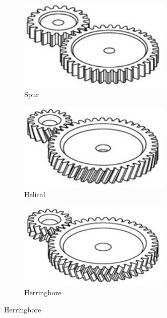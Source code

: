 \documentclass[10pt,letterpaper]{book}
\begin{document}
\begin{figure}[H]
	\begin{subfigure}[b]{.32\linewidth}
		\includegraphics[width=0.8\textwidth]{imgs/gear_spur.png}
		\caption{Spur}
	\end{subfigure}\begin{subfigure}[b]{.32\linewidth}
		\includegraphics[width=0.8\textwidth]{imgs/gear_helical.png}
		\caption{Helical}
	\end{subfigure}\begin{subfigure}[b]{.32\linewidth}
		\includegraphics[width=0.8\textwidth]{imgs/gear_herringbore.png}
		\caption{Herringbore}
	\end{subfigure}
	

\end{figure}
\end{document}
